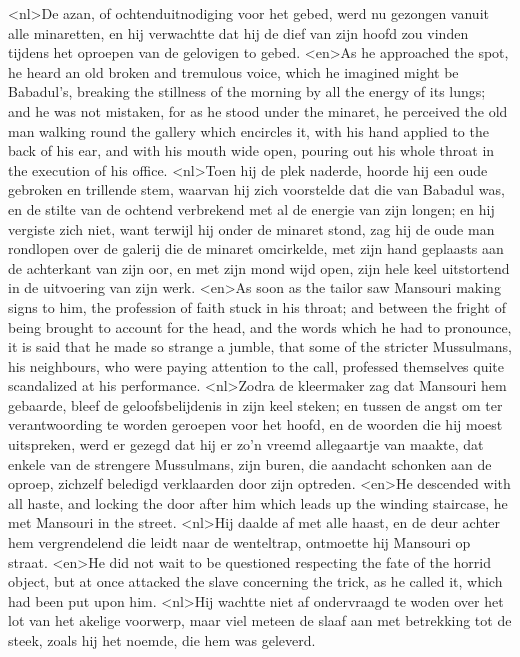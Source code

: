 <nl>De azan, of ochtenduitnodiging voor het  gebed, werd nu gezongen vanuit alle minaretten, en hij verwachtte dat hij de dief van zijn hoofd zou vinden tijdens het oproepen van de gelovigen to gebed.
<en>As he approached the spot, he heard an old broken and tremulous voice, which he imagined might be Babadul's, breaking the stillness of the morning by all the energy of its lungs; and he was not mistaken, for as he stood under the minaret, he perceived the old man walking round the gallery which encircles it, with his hand applied to the back of his ear, and with his mouth wide open, pouring out his whole throat in the execution of his office.
<nl>Toen hij de plek naderde, hoorde hij een oude gebroken en trillende stem, waarvan hij zich voorstelde dat die van Babadul was, en de stilte van de ochtend verbrekend met al de energie van zijn longen; en hij vergiste zich niet, want terwijl hij onder de minaret stond, zag hij de oude man rondlopen over de galerij die de minaret omcirkelde, met zijn hand geplaasts aan de achterkant van zijn oor, en met zijn mond wijd open, zijn hele keel uitstortend in de uitvoering van zijn werk.
<en>As soon as the tailor saw Mansouri making signs to him, the profession of faith stuck in his throat; and between the fright of being brought to account for the head, and the words which he had to pronounce, it is said that he made so strange a jumble, that some of the stricter Mussulmans, his neighbours, who were paying attention to the call, professed themselves quite scandalized at his performance.
<nl>Zodra de kleermaker zag dat Mansouri hem gebaarde, bleef de geloofsbelijdenis in zijn keel steken; en tussen de angst om ter verantwoording te worden geroepen voor het hoofd, en de woorden die hij moest uitspreken, werd er  gezegd dat hij er zo'n vreemd allegaartje van maakte, dat enkele van de strengere Mussulmans, zijn buren, die aandacht schonken aan de oproep,  zichzelf beledigd verklaarden door zijn optreden.
<en>He descended with all haste, and locking the door after him which leads up the winding staircase, he met Mansouri in the street.
<nl>Hij daalde af met alle haast, en  de deur achter hem vergrendelend die leidt naar de wenteltrap, ontmoette hij Mansouri op straat.
<en>He did not wait to be questioned respecting the fate of the horrid object, but at once attacked the slave concerning the trick, as he called it, which had been put upon him.
<nl>Hij wachtte niet af ondervraagd te woden over het lot van het akelige voorwerp, maar viel meteen de slaaf aan met betrekking tot de steek, zoals hij het noemde, die hem was geleverd.
